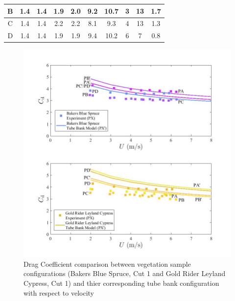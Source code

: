 \documentclass[12pt]{article}
\begin{document}
\begin{table}[!]
\begin{tabular}{|c|c|c|c|c|c|c|c|c|c|}
    B                            & 1.4          & 1.4      & 1.9                  & 2.0               & 9.2               & 10.7        & 3                           & 13            &   1.7                  \\ \hline
    C                            & 1.4           & 1.4     & 2.2                  & 2.2                & 8.1               & 9.3       & 4                          & 13               &   1.3       \\ \hline
    D                            & 1.4            & 1.4      & 1.9                  & 1.9                & 9.4               & 10.2       & 6                          & 7              &   0.8             \\ \hline
    \end{tabular}
\end{table}

\begin{figure}[!]
	\centering 	
\includegraphics[width=1\linewidth]{Picture13.jpg}
	\caption[Drag Coefficient comparison between vegetation samples and tube bank configurations]{Drag Coefficient comparison between vegetation sample configurations (Bakers Blue Spruce, Cut 1 and Gold Rider Leyland Cypress, Cut 1) and thier corresponding tube bank configuration with respect to velocity}
	\label{fig:TBGR}
\end{figure}
\end{document}
